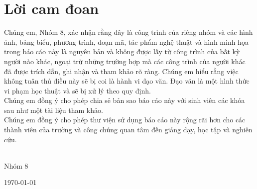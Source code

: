 \documentclass[a4paper,11pt,oneside]{book}
\def\groupno{8}
\begin{document}
    \chapter*{\Large Lời cam đoan}
    Chúng em, Nhóm \groupno, xác nhận rằng đây là công trình của riêng nhóm và các hình ảnh, bảng biểu, phương trình, đoạn mã, tác phẩm nghệ thuật và hình minh họa trong báo cáo này là nguyên bản và không được lấy từ công trình của bất kỳ người nào khác, ngoại trừ những trường hợp mà các công trình của người khác đã được trích dẫn, ghi nhận và tham khảo rõ ràng. Chúng em hiểu rằng việc không tuân thủ điều này sẽ bị coi là hành vi đạo văn. Đạo văn là một hình thức vi phạm học thuật và sẽ bị xử lý theo quy định.\\
    
    \noindent
    Chúng em đồng ý cho phép chia sẻ bản sao báo cáo này với sinh viên các khóa sau như một tài liệu tham khảo.\\
    
    \noindent
    Chúng em đồng ý cho phép thư viện sử dụng báo cáo này rộng rãi hơn cho các thành viên của trường và công chúng quan tâm đến giảng dạy, học tập và nghiên cứu.\\
    ~\\[1cm]
    \begin{flushright}
    	Nhóm \groupno
    
    	\today
    \end{flushright}

    
    \tableofcontents
    \listoffigures
    \listoftables
\end{document}

